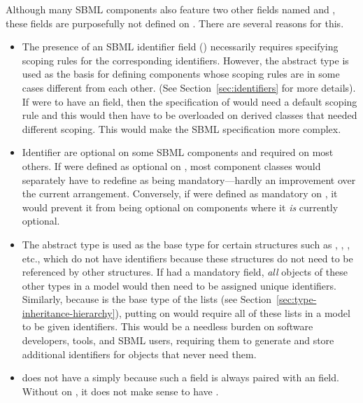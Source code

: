 
Although many SBML components also feature two other fields named
 and , these fields are purposefully not defined on
\SBase.  There are several reasons for this.
\begin{itemize}
  
\item The presence of an SBML identifier field ()
  necessarily requires specifying scoping rules for the
  corresponding identifiers.  However, the \SBase abstract type is
  used as the basis for defining components whose scoping rules
  are in some cases different from each other.  (See
  Section~\ref{sec:identifiers} for more details).  If \SBase were
  to have an  field, then the specification of \SBase
  would need a default scoping rule and this would then have to be
  overloaded on derived classes that needed different scoping.
  This would make the SBML specification more complex.
  
\item Identifier are optional on some SBML components and required
  on most others.  If  were defined as optional on
  \SBase, most component classes would separately have to redefine
   as being mandatory---hardly an improvement over the
  current arrangement.  Conversely, if  were defined as
  mandatory on \SBase, it would prevent it from being optional on
  components where it \emph{is} currently optional.
  
\item The \SBase abstract type is used as the base type for
  certain structures such as \Sbml, \Unit, \AssignmentRule, etc.,
  which do not have identifiers because these structures do not
  need to be referenced by other structures.  If \SBase had a
  mandatory  field, \emph{all} objects of these other
  types in a model would then need to be assigned unique
  identifiers.  Similarly, because \SBase is the base type of the
   lists (see
  Section~\ref{sec:type-inheritance-hierarchy}), putting
   on \SBase would require all of these lists in a model
  to be given identifiers.  This would be a needless burden on
  software developers, tools, and SBML users, requiring them to
  generate and store additional identifiers for objects that never
  need them.
  
\item \SBase does not have a  simply because such a
  field is always paired with an  field.  Without
   on \SBase, it does not make sense to have
  .

\end{itemize}


